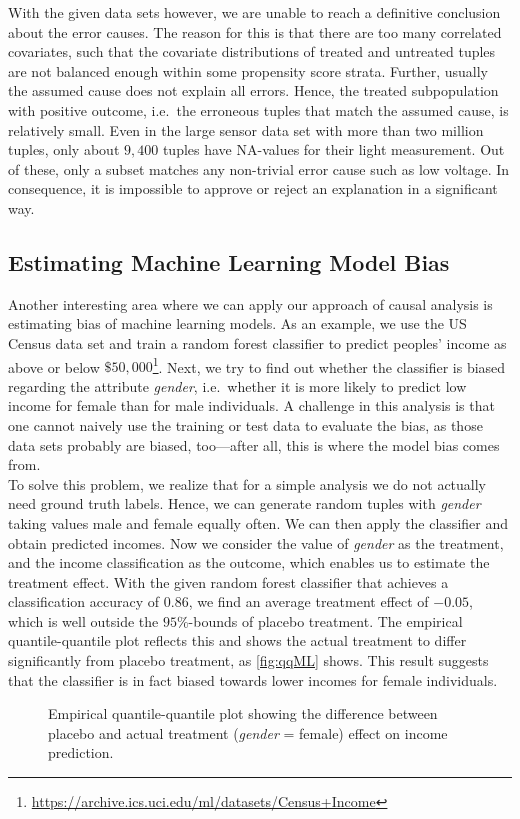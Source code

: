 \documentclass[acmsmall, nonacm, screen]{acmart} %
\begin{document}
With the given data sets however, we are unable to reach a definitive conclusion about the error causes.
The reason for this is that there are too many correlated covariates, such that the covariate distributions of treated and untreated tuples are not balanced enough within some propensity score strata.
Further, usually the assumed cause does not explain all errors. Hence, the treated subpopulation with positive outcome, i.e.\ the erroneous tuples that match the assumed cause, is relatively small. 
Even in the large sensor data set with more than two million tuples, only about $9,400$ tuples have NA-values for their light measurement. Out of these, only a subset matches any non-trivial error cause such as low voltage.
In consequence, it is impossible to approve or reject an explanation in a significant way.

\subsection{Estimating Machine Learning Model Bias}
Another interesting area where we can apply our approach of causal analysis is estimating bias of machine learning models.
As an example, we use the US Census data set and train a random forest classifier to predict peoples' income as above or below $\$50,000$\footnote{\url{https://archive.ics.uci.edu/ml/datasets/Census+Income}}.
Next, we try to find out whether the classifier is biased regarding the attribute \textit{gender}, i.e.\ whether it is more likely to predict low income for female than for male individuals.
A challenge in this analysis is that one cannot naively use the training or test data to evaluate the bias, as those data sets probably are biased, too---after all, this is where the model bias comes from.\\

To solve this problem, we realize that for a simple analysis we do not actually need ground truth labels. 
Hence, we can generate random tuples with \textit{gender} taking values male and female equally often. We can then apply the classifier and obtain predicted incomes. 
Now we consider the value of \textit{gender} as the treatment, and the income classification as the outcome, which enables us to estimate the treatment effect.
With the given random forest classifier that achieves a classification accuracy of $0.86$, we find an average treatment effect of $-0.05$, which is well outside the $95\%$-bounds of placebo treatment.
The empirical quantile-quantile plot reflects this and shows the actual treatment to differ significantly from placebo treatment, as \autoref{fig:qqML} shows.
This result suggests that the classifier is in fact biased towards lower incomes for female individuals.
\begin{figure}[htbp]
\caption{Empirical quantile-quantile plot showing the difference between placebo and actual treatment (\textit{gender} = female) effect on income prediction.}
\label{fig:qqML}
\end{figure}
\end{document}
